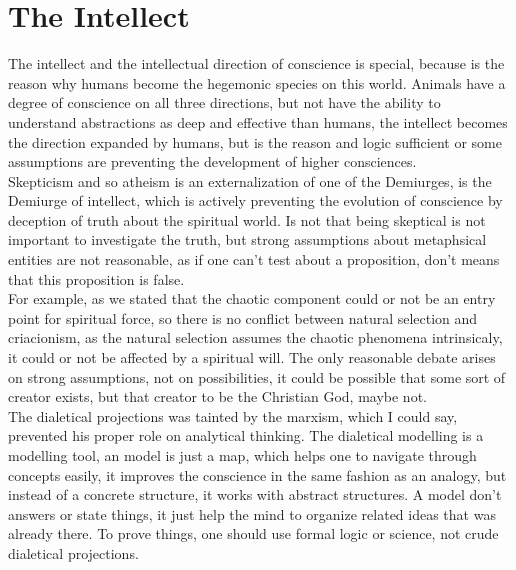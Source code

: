 \documentclass[12pt,a4paper]{article}
\begin{document}
\section{The Intellect}

\hspace{\baselineskip}

The intellect and the intellectual direction of conscience is special, because is the reason why humans become the hegemonic species on this world. Animals have a degree of conscience on all three directions, but not have the ability to understand abstractions as deep and effective than humans, the intellect becomes the direction expanded by humans, but is the reason and logic sufficient or some assumptions are preventing the development of higher consciences.\\

Skepticism and so atheism is an externalization of one of the Demiurges, is the Demiurge of intellect, which is actively preventing the evolution of conscience by deception of truth about the spiritual world. Is not that being skeptical is not important to investigate the truth, but strong assumptions about metaphsical entities are not reasonable, as if one can't test about a proposition, don't means that this proposition is false.\\ 

For example, as we stated that the chaotic component could or not be an entry point for spiritual force, so there is no conflict between natural selection and criacionism, as the natural selection assumes the chaotic phenomena intrinsicaly, it could or not be affected by a spiritual will. The only reasonable debate arises on strong assumptions, not on possibilities, it could be possible that some sort of creator exists, but that creator to be the Christian God, maybe not.\\

The dialetical projections was tainted by the marxism, which I could say, prevented his proper role on analytical thinking. The dialetical modelling is a modelling tool, an model is just a map, which helps one to navigate through concepts easily, it improves the conscience in the same fashion as an analogy, but instead of a concrete structure, it works with abstract structures. A model don't answers or state things, it just help the mind to organize related ideas that was already there. To prove things, one should use formal logic or science, not crude dialetical projections.\\ 
\end{document}
